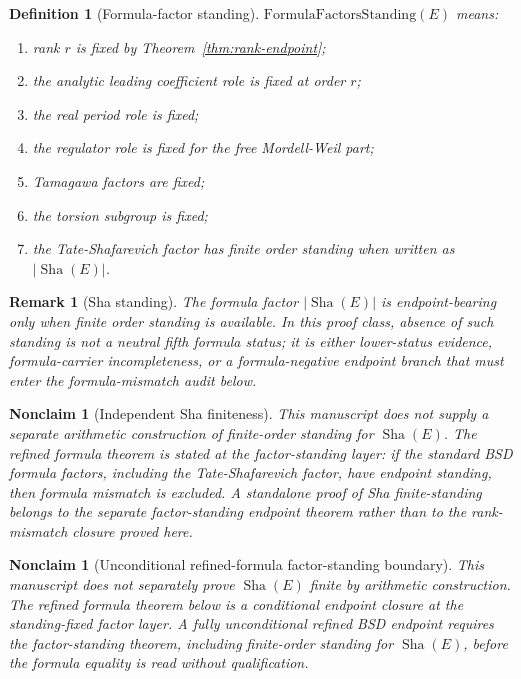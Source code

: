 \documentclass[11pt]{article}
\newtheorem{definition}[theorem]{Definition}
\newtheorem{nonclaim}[theorem]{Nonclaim}
\newtheorem{remark}[theorem]{Remark}
\newcommand{\Sha}{\operatorname{Sha}}
\begin{document}
\begin{definition}[Formula-factor standing]
$\mathrm{FormulaFactorsStanding}(E)$ means:
\begin{enumerate}[label=(\alph*)]
\item rank $r$ is fixed by Theorem~\ref{thm:rank-endpoint};
\item the analytic leading coefficient role is fixed at order $r$;
\item the real period role is fixed;
\item the regulator role is fixed for the free Mordell-Weil part;
\item Tamagawa factors are fixed;
\item the torsion subgroup is fixed;
\item the Tate-Shafarevich factor has finite order standing when written as $|\Sha(E)|$.
\end{enumerate}
\end{definition}

\begin{remark}[Sha standing]
The formula factor $|\Sha(E)|$ is endpoint-bearing only when finite order standing is available. In this proof class, absence of such standing is not a neutral fifth formula status; it is either lower-status evidence, formula-carrier incompleteness, or a formula-negative endpoint branch that must enter the formula-mismatch audit below.
\end{remark}

\begin{nonclaim}[Independent Sha finiteness]
This manuscript does not supply a separate arithmetic construction of finite-order standing for $\Sha(E)$. The refined formula theorem is stated at the factor-standing layer: if the standard BSD formula factors, including the Tate-Shafarevich factor, have endpoint standing, then formula mismatch is excluded. A standalone proof of Sha finite-standing belongs to the separate factor-standing endpoint theorem rather than to the rank-mismatch closure proved here.
\end{nonclaim}


\begin{nonclaim}[Unconditional refined-formula factor-standing boundary]
This manuscript does not separately prove $\Sha(E)$ finite by arithmetic construction. The refined formula theorem below is a conditional endpoint closure at the standing-fixed factor layer. A fully unconditional refined BSD endpoint requires the factor-standing theorem, including finite-order standing for $\Sha(E)$, before the formula equality is read without qualification.
\end{nonclaim}
\end{document}
